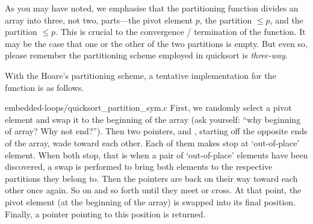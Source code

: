 As you may have noted, we emphasise that the partitioning function divides an array into three, not
two, parts---the pivot element $p$, the partition $\leq p$, and the partition $\leq p$.
This is crucial to the convergence / termination of the function.
It may be the case that one or the other of the two partitions is empty.
But even so, please remember the partitioning scheme employed in quicksort is \emph{three-way}.


With the Hoare's partitioning scheme, a tentative implementation for the function  is as
follows.

{embedded-loops/quicksort_partition_sym.c}
First, we randomly select a pivot element and swap it to the beginning of the array
(ask yourself: ``why beginning of array?
Why not end?'').
Then two pointers,  and , starting off the opposite ends of the array,
wade toward each other.
Each of them makes stop at `out-of-place' element.
When both stop, that is when a pair of `out-of-place' elements have been discovered,
a swap is performed to bring both elements to the respective partitions they belong to.
Then the pointers are back on their way toward each other once again.
So on and so forth until they meet or cross.
At that point, the pivot element (at the beginning of the array) is swapped into its final position.
Finally, a pointer pointing to this position is returned.


